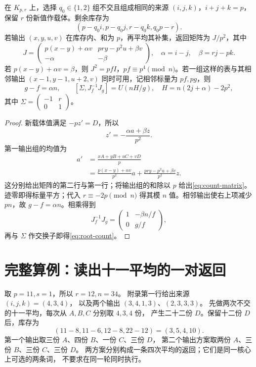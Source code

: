 \begin{lemma}[由库存表计算返回矩阵]\label{lem:count-interface}
在 $K_{p,r}$ 上，选择 $q_0\in\{1,2\}$ 组不交且组成相同的来源 $(i,j,k)$，$i+j+k=p$，保留 $r$ 份新值作载体。剩余库存为
\begin{equation}\label{eq:stock}
(p-q_0i,p-q_0j,r-q_0k,q_0p-r).
\end{equation}
若输出 $(x,y,u,v)$ 在库存内、和为 $p$，再平均其补集，返回矩阵为 $J/p^2$，其中
\begin{equation}\label{eq:count-matrix}
J=\begin{pmatrix}p(x-y)+\alpha v&pry-p^2u+\beta v\\-\alpha&-\beta\end{pmatrix},
\quad \alpha=i-j,\quad\beta=rj-pk.
\end{equation}
若 $p(x-y)+\alpha v=\beta$，则 $J^2=pfI$，$pf\equiv p^4\pmod n$。若一组这样的表与其相邻输出 $(x-1,y-1,u+2,v)$ 同时可用，记相邻标量为 $pf,pg$，则
\begin{equation}\label{eq:root-count}
g-f=\alpha n,\qquad
[\Sigma,J_f^{-1}J_g]=U(nH/g),\quad H=n(2j+\alpha)-2p^2,
\end{equation}
其中 $\Sigma=\left(\begin{smallmatrix}-1&r\\0&1\end{smallmatrix}\right)$。
\end{lemma}
\begin{proof}

新载体值满足 $-pz'=D$，所以
\[
z'=-\frac{\alpha a+\beta z}{p^2}.
\]
第一输出组的均值为
\begin{align*}
a'&=\frac{xA+yB+uC+vD}{p}\\
&=\frac{p(x-y)+\alpha v}{p^2}a
 +\frac{pry-p^2u+\beta v}{p^2}z.
\end{align*}
这分别给出矩阵的第二行与第一行；将输出组的和除以 $p$ 给出\eqref{eq:count-matrix}。迹零即得标量平方；代入 $r\equiv-2p\pmod n$ 得其模 $n$ 值。相邻输出使右上项减少 $pn$，故 $g-f=\alpha n$。相乘得到
\[
J_f^{-1}J_g=\begin{pmatrix}1&-\beta n/f\\0&g/f\end{pmatrix},
\]
再与 $\Sigma$ 作交换子即得\eqref{eq:root-count}。
\end{proof}

\section{完整算例：读出十一平均的一对返回}
取 $p=11,s=1$，所以 $r=12,n=34$。
附录第一行给出来源 $(i,j,k)=(4,3,4)$，
以及两个输出 $(3,4,1,3)$、$(2,3,3,3)$。
先做两次不交的十一平均，每次从 $A,B,C$ 分别取 $4,3,4$ 份，
产生二十二份 $D$。保留十二份 $D$ 后，库存为
\[
(11-8,11-6,12-8,22-12)=(3,5,4,10).
\]
第一个输出取三份 $A$、四份 $B$、一份 $C$、三份 $D$，
第二个输出方案取两份 $A$、三份 $B$、三份 $C$、三份 $D$。
两方案分别构成一条四次平均的返回；它们是同一核心上可选的两条词，
不要求在同一轮同时执行。


